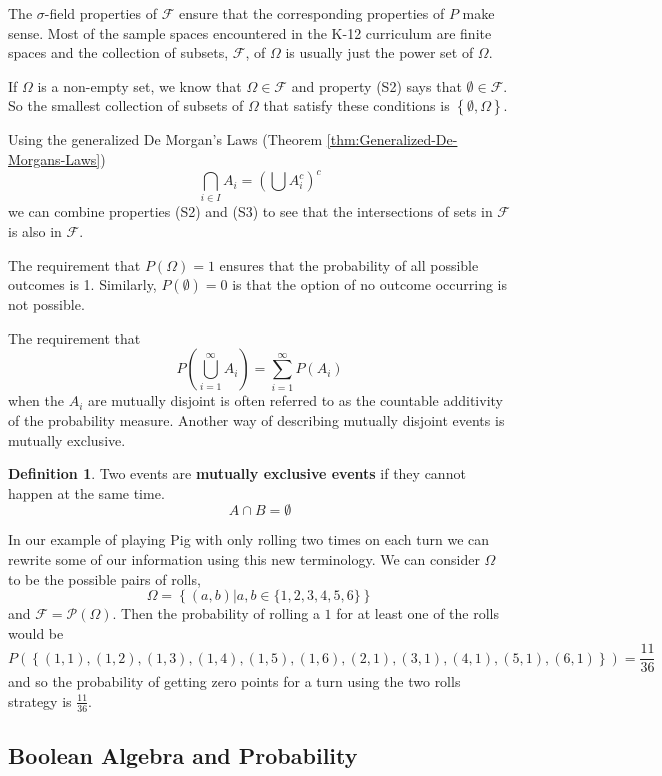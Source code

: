 \documentclass[
]{book}
\theoremstyle{definition}
\newtheorem{definition}{Definition}[chapter]
\theoremstyle{definition}
\theoremstyle{definition}
\theoremstyle{definition}
\theoremstyle{remark}
\begin{document}
The \(\sigma\)-field properties of \(\mathcal{F}\) ensure that the corresponding properties of \(P\) make sense. Most of the sample spaces encountered in the K-12 curriculum are finite spaces and the collection of subsets, \(\mathcal{F}\), of \(\Omega\) is usually just the power set of \(\Omega\).

If \(\Omega\) is a non-empty set, we know that \(\Omega \in \mathcal{F}\) and property (S2) says that \(\emptyset\in \mathcal{F}\). So the smallest collection of subsets of \(\Omega\) that satisfy these conditions is \(\left\{ \emptyset, \Omega \right\}\).

Using the generalized De Morgan's Laws (Theorem \ref{thm:Generalized-De-Morgans-Laws})
\[\bigcap_{i\in I} A_i = \left( \bigcup A_i^c \right)^c\] we can combine properties (S2) and (S3) to see that the intersections of sets in \(\mathcal{F}\) is also in \(\mathcal{F}\).

The requirement that \(P(\Omega)=1\) ensures that the probability of all possible outcomes is 1. Similarly, \(P(\emptyset)=0\) is that the option of no outcome occurring is not possible.

The requirement that \[P\left(\bigcup_{i=1}^\infty A_i \right) = \sum_{i=1}^\infty P(A_i)\] when the \(A_i\) are mutually disjoint is often referred to as the countable additivity of the probability measure. Another way of describing mutually disjoint events is mutually exclusive.

\begin{definition}
Two events are \textbf{mutually exclusive events} if they cannot happen at the same time.
\[A\cap B =\emptyset\]
\end{definition}

In our example of playing Pig with only rolling two times on each turn we can rewrite some of our information using this new terminology. We can consider \(\Omega\) to be the possible pairs of rolls, \[\Omega = \left\{ (a,b) \vert a,b\in \{1,2,3,4,5,6\} \right\}\] and \(\mathcal{F} = \mathcal{P}\left(\Omega \right)\). Then the probability of rolling a \(1\) for at least one of the rolls would be
\[P\left( \left\{ (1,1), (1,2), (1,3), (1,4), (1,5), (1,6), (2,1), (3,1), (4,1), (5,1), (6,1) \right\} \right) = \frac{11}{36}\] and so the probability of getting zero points for a turn using the two rolls strategy is \(\frac{11}{36}\).

\hypertarget{boolean-algebra-and-probability}{%
\subsection{Boolean Algebra and Probability}\label{boolean-algebra-and-probability}}
\end{document}
